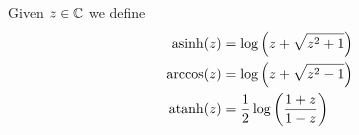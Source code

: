 \documentclass[../complete.tex]{subfiles}
\begin{document}
\begin{dfn}
	Given $z\in\mathbb{C}$ we define
	\begin{equation}
		\begin{aligned}
			\operatorname{\mathrm{asinh}}(z)&=\log\left( z+\sqrt{z^2+1} \right)\\
			\arccos(z)&=\log\left( z+\sqrt{z^2-1} \right)\\
			\operatorname{\mathrm{atanh}}(z)&=\frac{1}{2}\log\left( \frac{1+z}{1-z} \right)
		\end{aligned}
		\label{eq:inversehypfunc}
	\end{equation}
\end{dfn}
\end{document}
